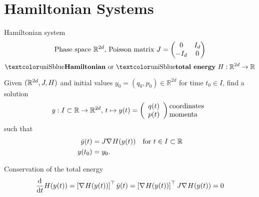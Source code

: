 \section{Hamiltonian Systems}

\begin{frame}{Hamiltonian system}
  \begin{equation*}
    \text{Phase space } \mathbb{R}^{2d},\,
    \text{Poisson matrix } J = \begin{pmatrix}
      0 & I_d \\
      -I_d & 0
    \end{pmatrix}
  \end{equation*}
  \begin{equation*}
    \text{\bemph{Hamiltonian} or \bemph{total energy} }
    H: \mathbb{R}^{2d} \to \mathbb{R}
  \end{equation*}

  \begin{definition}
    Given $(\mathbb{R}^{2d}, J, H)$ and initial values
    $y_0 = (q_0, p_0) \in \mathbb{R}^{2d}$ for time $t_0 \in I$, 
    find a solution 
    \begin{equation*}
      y: I \subset \mathbb{R} \to \mathbb{R}^{2d},\, t \mapsto y(t) =
      \left(
      \begin{array}{c}
        q(t)\\
        p(t)
      \end{array}
      \right)\hspace{-5pt}
      \begin{array}{l}
        \text{coordinates}\\
        \text{momenta}\\
      \end{array}
    \end{equation*}
    such that
    \begin{align*}
      \dot{y}(t) &= J \nabla_{}{H}(y(t)) \quad \text{for } t \in I \subset \mathbb{R} \\
      y(t_0) &= y_0
      .
    \end{align*}
  \end{definition}
  \nocite{hairer2006}
\end{frame}

\begin{frame}[c]{Conservation of the total energy}
  \centering
  \begin{equation*}
    \frac{\mathrm{d}^{}}{\mathrm{d}t} H(y(t)) = \left[ \nabla_{}{H}(y(t)) \right]^\top \dot{y}(t) = 
    \left[ \nabla_{}{H}(y(t)) \right]^\top J \nabla_{}{H}(y(t)) = 0
  \end{equation*}
\end{frame}


